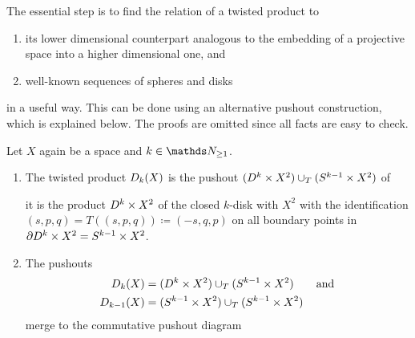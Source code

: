 The essential step is to find the relation of a twisted product to
\begin{enumerate}[1.]
\item its lower dimensional counterpart analogous to the embedding of
  a projective space into a higher dimensional one, and
\item well-known sequences of spheres and disks
\end{enumerate}
in a useful way.
This can be done using an alternative pushout construction, which is
explained below. The proofs are omitted since all facts are easy to check.
\begin{Fact}
  Let $X$ again be a space and $k\in\Nat_{\geq1}$.
  \begin{enumerate}
  \item
    The twisted product $D_{k}({X})$ is the pushout
    $(D^{k}\times X^2)\cup_{T}(S^{k-1}\times X^2)$ of
    \begin{center}
    \end{center}
    \idest it is the product $D^{k}\times X^2$ of the closed
    $k$-disk with $X^2$ with the identification
    $(s,p,q)=T((s,p,q))\coloneqq(-s,q,p)$ on all boundary points in
    $\partial{D^{k}\times X^2}=S^{k-1}\times X^2$.
  \item
    The pushouts
    \begin{align*}
      D_{k}({X})
      &=(D^{k}\times X^2)\cup_{T}(S^{k-1}\times X^2)
        \qquad\text{and}\\
      D_{k-1}({X})
      &=(S^{k-1}\times X^2)\cup_{T}(S^{k-1}\times X^2)
    \end{align*}
    merge to the commutative pushout diagram
    \begin{center}

\end{center}
\end{enumerate}
\end{Fact}
